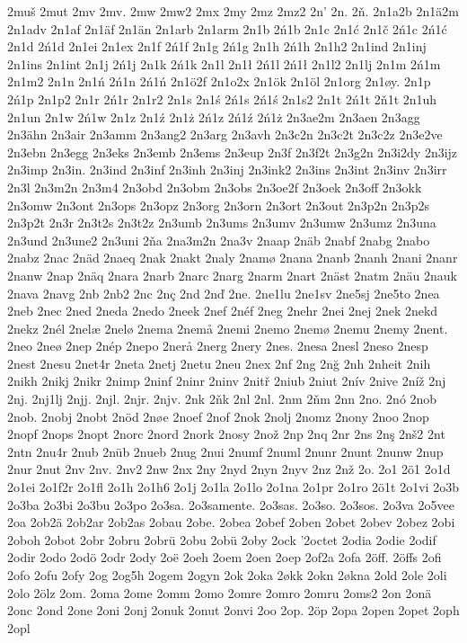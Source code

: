 2muš
2mut
2mv
2mv.
2mw
2mw2
2mx
2my
2mz
2mz2
2n'
2n.
2ň.
2n1a2b
2n1ä2m
2n1adv
2n1af
2n1äf
2n1än
2n1arb
2n1arm
2n1b
2ń1b
2n1c
2n1ć
2n1č
2ń1c
2ń1ć
2n1d
2ń1d
2n1ei
2n1ex
2n1f
2ń1f
2n1g
2ń1g
2n1h
2ń1h
2n1h2
2n1ind
2n1inj
2n1ins
2n1int
2n1j
2ń1j
2n1k
2ń1k
2n1l
2n1ł
2ń1l
2ń1ł
2n1l2
2n1lj
2n1m
2ń1m
2n1m2
2n1n
2n1ń
2ń1n
2ń1ń
2n1ö2f
2n1o2x
2n1ök
2n1öl
2n1org
2n1øy.
2n1p
2ń1p
2n1p2
2n1r
2ń1r
2n1r2
2n1s
2n1ś
2ń1s
2ń1ś
2n1s2
2n1t
2ń1t
2ň1t
2n1uh
2n1un
2n1w
2ń1w
2n1z
2n1ź
2n1ż
2ń1z
2ń1ź
2ń1ż
2n3ae2m
2n3aen
2n3agg
2n3ähn
2n3air
2n3amm
2n3ang2
2n3arg
2n3avh
2n3c2n
2n3c2t
2n3c2z
2n3e2ve
2n3ebn
2n3egg
2n3eks
2n3emb
2n3ems
2n3eup
2n3f
2n3f2t
2n3g2n
2n3i2dy
2n3ijz
2n3imp
2n3in.
2n3ind
2n3inf
2n3inh
2n3inj
2n3ink2
2n3ins
2n3int
2n3inv
2n3irr
2n3l
2n3m2n
2n3m4
2n3obd
2n3obm
2n3obs
2n3oe2f
2n3oek
2n3off
2n3okk
2n3omw
2n3ont
2n3ops
2n3opz
2n3org
2n3orn
2n3ort
2n3out
2n3p2n
2n3p2s
2n3p2t
2n3r
2n3t2s
2n3t2z
2n3umb
2n3ums
2n3umv
2n3umw
2n3umz
2n3una
2n3und
2n3une2
2n3uni
2ňa
2na3m2n
2na3v
2naap
2näb
2nabf
2nabg
2nabo
2nabz
2nac
2näd
2naeq
2nak
2nakt
2naly
2namø
2nana
2nanb
2nanh
2nani
2nanr
2nanw
2nap
2näq
2nara
2narb
2narc
2narg
2narm
2nart
2näst
2natm
2näu
2nauk
2nava
2navg
2nb
2nb2
2nc
2nç
2nd
2nď
2ne.
2ne1lu
2ne1sv
2ne5sj
2ne5to
2nea
2neb
2nec
2ned
2neda
2nedo
2neek
2nef
2néf
2neg
2nehr
2nei
2nej
2nek
2nekd
2nekz
2nél
2nelæ
2nelø
2nema
2nemå
2nemi
2nemo
2nemø
2nemu
2nemy
2nent.
2neo
2neø
2nep
2nép
2nepo
2nerå
2nerg
2nery
2nes.
2nesa
2nesl
2neso
2nesp
2nest
2nesu
2net4r
2neta
2netj
2netu
2neu
2nex
2nf
2ng
2nğ
2nh
2nheit
2nih
2nikh
2nikj
2nikr
2nimp
2ninf
2ninr
2ninv
2nitř
2niub
2niut
2nív
2nive
2níž
2nj
2nj.
2nj1lj
2njj.
2njl.
2njr.
2njv.
2nk
2ňk
2nl
2nl.
2nm
2ňm
2nn
2no.
2nó
2nob
2nob.
2nobj
2nobt
2nöd
2nøe
2noef
2nof
2nok
2nolj
2nomz
2nony
2noo
2nop
2nopf
2nops
2nopt
2norc
2nord
2nork
2nosy
2nož
2np
2nq
2nr
2ns
2nş
2nš2
2nt
2ntn
2nu4r
2nub
2nüb
2nueb
2nug
2nui
2numf
2numl
2nunr
2nunt
2nunw
2nup
2nur
2nut
2nv
2nv.
2nv2
2nw
2nx
2ny
2nyd
2nyn
2nyv
2nz
2nž
2o.
2o1
2ö1
2o1d
2o1ei
2o1f2r
2o1fl
2o1h
2o1h6
2o1j
2o1la
2o1lo
2o1na
2o1pr
2o1ro
2ö1t
2o1vi
2o3b
2o3ba
2o3bi
2o3bu
2o3po
2o3sa.
2o3samente.
2o3sas.
2o3so.
2o3sos.
2o3va
2o5vee
2oa
2ob2ä
2ob2ar
2ob2as
2obau
2obe.
2obea
2obef
2oben
2obet
2obev
2obez
2obi
2oboh
2obot
2obr
2obru
2obrü
2obu
2obü
2oby
2ock
'2octet
2odia
2odie
2odif
2odir
2odo
2odö
2odr
2ody
2oë
2oeh
2oem
2oen
2oep
2of2a
2ofa
2öff.
2öffs
2ofi
2ofo
2ofu
2ofy
2og
2og5h
2ogem
2ogyn
2ok
2oka
2økk
2okn
2økna
2old
2ole
2oli
2olo
2ölz
2om.
2oma
2ome
2omm
2omo
2omre
2omro
2omru
2oms2
2on
2onä
2onc
2ond
2one
2oni
2onj
2onuk
2onut
2onvi
2oo
2op.
2öp
2opa
2open
2opet
2oph
2opl
